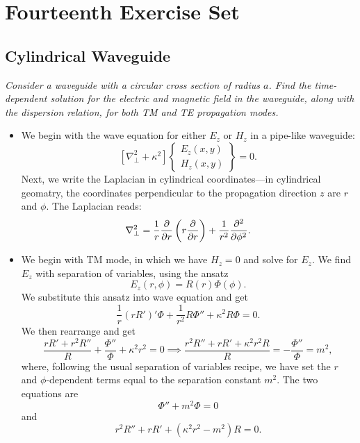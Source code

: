 \documentclass[11pt, a4paper]{article}
\renewcommand{\laplacian}{\nabla^{2}}
\begin{document}
\section{Fourteenth Exercise Set}

\subsection{Cylindrical Waveguide}
\textit{Consider a waveguide with a circular cross section of radius $ a $. Find the time-dependent solution for the electric and magnetic field in the waveguide, along with the dispersion relation, for both TM and TE propagation modes.}

\begin{itemize}
	\item We begin with the wave equation for either $ E_{z} $ or $ H_{z} $ in a pipe-like waveguide:
	\begin{equation*}
		\left[\laplacian_{\perp} + \kappa^{2}\right]
		\begin{Bmatrix}
			E_{z}(x, y)\\
			H_{z}(x, y)
		\end{Bmatrix}
		 = 0.
	\end{equation*}
	Next, we write the Laplacian in cylindrical coordinates---in cylindrical geomatry, the coordinates perpendicular to the propagation direction $ z $ are $ r $ and $ \phi $. The Laplacian reads:
	\begin{equation*}
		\laplacian_{\perp} = \frac{1}{r}\pdv{r}\left(r \pdv{r}\right) + \frac{1}{r^{2}} \pdv[2]{}{\phi}.
	\end{equation*}

    \item We begin with TM mode, in which we have $ H_{z} = 0 $ and solve for $ E_{z} $. We find $ E_{z} $ with separation of variables, using the ansatz
	\begin{equation*}
        E_{z}(r, \phi) = R(r) \Phi(\phi) .
	\end{equation*}
	We substitute this ansatz into wave equation and get
	\begin{equation*}
		\frac{1}{r}\left(rR'\right)'\Phi + \frac{1}{r^{2}}R\Phi'' + \kappa^{2}R\Phi = 0.
	\end{equation*}
	We then rearrange and get
	\begin{equation*}
		\frac{rR' + r^{2}R''}{R} + \frac{\Phi''}{\Phi} + \kappa^{2}r^{2} = 0 \implies \frac{r^{2}R'' + rR' + \kappa^{2}r^{2}R}{R} = -\frac{\Phi''}{\Phi} = m^{2},
	\end{equation*}
	where, following the usual separation of variables recipe, we have set the $ r $ and $ \phi $-dependent terms equal to the separation constant $ m^{2} $. The two equations are
	\begin{equation*}
		\Phi'' + m^{2}\Phi = 0
	\end{equation*}
	and
	\begin{equation*}
		r^{2}R'' + rR' + (\kappa^{2}r^{2} - m^{2})R = 0.
	\end{equation*}
	

\end{itemize}
\end{document}
